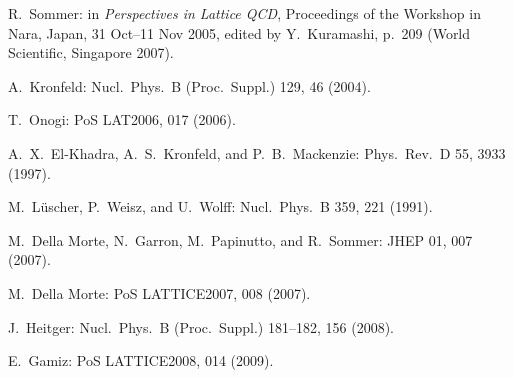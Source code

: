 \begin{enumerate}[label={[\arabic*]}]
  \item R.~Sommer: in \emph{Perspectives in Lattice QCD}, Proceedings of the
        Workshop in Nara, Japan, 31 Oct--11 Nov 2005, edited by Y.~Kuramashi,
        p.~209 (World Scientific, Singapore 2007).
  \item A.~Kronfeld: Nucl.\ Phys.\ B (Proc.\ Suppl.) 129, 46 (2004).
  \item T.~Onogi: PoS LAT2006, 017 (2006).
  \item A.~X.~El-Khadra, A.~S.~Kronfeld, and P.~B.~Mackenzie: Phys.\ Rev.\ D
        55, 3933 (1997).
  \item M.~L\"uscher, P.~Weisz, and U.~Wolff: Nucl.\ Phys.\ B 359, 221 (1991).
  \item M.~Della Morte, N.~Garron, M.~Papinutto, and R.~Sommer: JHEP 01, 007
        (2007).
  \item M.~Della Morte: PoS LATTICE2007, 008 (2007).
  \item J.~Heitger: Nucl.\ Phys.\ B (Proc.\ Suppl.) 181--182, 156 (2008).
  \item E.~Gamiz: PoS LATTICE2008, 014 (2009).
\end{enumerate}
